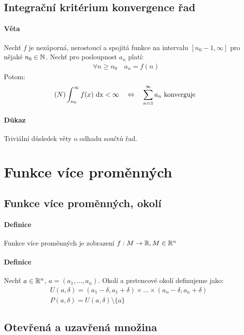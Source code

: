 \documentclass[a4paper,10pt]{article}
\begin{document}
\subsection{Integrační kritérium konvergence řad}
\setcounter{equation}{0}
\paragraph{Věta}
Nechť $f$ je nezáporná, nerostoucí a spojitá funkce na intervalu $[n_0 - 1, \infty]$ 
pro nějaké $n_0 \in \mathbb{N}$. Nechť pro posloupnost $a_n$ platí: 
\begin{align*}
	\forall n \ge n_0 \quad a_n = f(n)
\end{align*}
Potom:
\begin{align*}
	(N) \int_{n_0}^\infty f(x) \operatorname*{\,dx} < \infty \quad \Leftrightarrow \quad
	\sum_{n=1}^\infty a_n \text{ konverguje }
\end{align*}

\paragraph{Důkaz}
Triviální důsledek věty o odhadu součtů řad.


\newpage
\section{Funkce více proměnných}
\setcounter{equation}{0}
\subsection{Funkce více proměnných, okolí}
\setcounter{equation}{0}
\paragraph{Definice}
Funkce více proměnných je zobrazení $f: M \to \mathbb{R}, M \in \mathbb{R}^n$
\paragraph{Definice}
Nechť $a \in \mathbb{R}^n$, $a = (a_1, ..., a_n)$. Okolí a prstencové okolí definujeme
jako:
\begin{align*}
	&U(a, \delta) = (a_1 - \delta, a_1 + \delta) \times ... \times (a_n - \delta,
	a_n + \delta) \\
	&P(a, \delta) = U(a, \delta) \setminus \{ a \}
\end{align*}

\subsection{Otevřená a uzavřená množina}
\setcounter{equation}{0}
\end{document}

